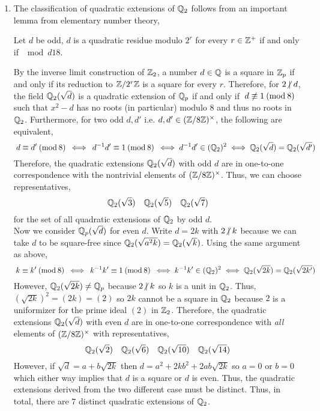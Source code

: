 \documentclass[12pt]{extarticle}
\begin{document}
\begin{enumerate}
\begin{enumerate}
\item The classification of quadratic extensions of $\mathbb{Q}_2$ follows from an important lemma from elementary number theory,
\begin{lemma}
Let $d$ be odd, $d$ is a quadratic residue modulo $2^r$ for every $r \in \mathbb{Z}^{+}$ if and only if $\mod{d}{1}{8}$. 
\end{lemma}
By the inverse limit construction of $\mathbb{Z}_2$, a number $d \in \mathbb{Q}$ is a square in $\mathbb{Z}_p$ if and only if its reduction to $\mathbb{Z}/2^r\mathbb{Z}$ is a square for every $r$. Therefore, for $2 \ndivides d$, the field $\mathbb{Q}_2(\sqrt{d})$ is a quadratic extension of $\mathbb{Q}_p$ if and only if $\nmod{d}{1}{8}$ such that $x^2 - d$ has no roots (in particular) modulo $8$ and thus no roots in $\mathbb{Q}_2$. Furthermore, for two odd $d,d'$ i.e. $d, d' \in (\mathbb{Z}/8\mathbb{Z})^\times$, the following are equivalent,
\[\: d \equiv d' \: (\mathrm{mod} \: 8) \: \iff \: d^{-1}d' \equiv 1 \: (\mathrm{mod} \: 8) \: \iff d^{-1} d' \in (\mathbb{Q}_2)^2 \iff \mathbb{Q}_2(\sqrt{d}) = \mathbb{Q}_2(\sqrt{d'})
\] 
Therefore, the quadratic extensions $\mathbb{Q}_2(\sqrt{d})$ with odd $d$ are in one-to-one correspondence with the nontrivial elements of $(\mathbb{Z}/8\mathbb{Z})^\times$. Thus, we can choose representatives,
\[ \mathbb{Q}_2(\sqrt{3}) \quad \mathbb{Q}_2(\sqrt{5}) \quad \mathbb{Q}_2(\sqrt{7})\]
for the set of all quadratic extensions of $\mathbb{Q}_2$ by odd $d$. \bigskip\\
Now we consider $\mathbb{Q}_p(\sqrt{d})$ for even $d$. Write $d = 2 k$ with $2 \ndivides k$ because we can take $d$ to be square-free since $\mathbb{Q}_2(\sqrt{a^2 k}) = \mathbb{Q}_2(\sqrt{k})$. Using the same argument as above,  
\[\: k \equiv k' \: (\mathrm{mod} \: 8) \: \iff \: k^{-1}k' \equiv 1 \: (\mathrm{mod} \: 8) \: \iff k^{-1} k' \in (\mathbb{Q}_2)^2 \iff \mathbb{Q}_2(\sqrt{2k}) = \mathbb{Q}_2(\sqrt{2k'})
\] 
However, $\mathbb{Q}_2(\sqrt{2k}) \neq \mathbb{Q}_p$ because $2 \ndivides k$ so $k$ is a unit in $\mathbb{Q}_2$. Thus, $(\sqrt{2k})^2 = (2k) = (2)$ so $2k$ cannot be a square in $\mathbb{Q}_2$ because $2$ is a uniformizer for the prime ideal $(2)$ in $\mathbb{Z}_2$. 
Therefore, the quadratic extensions $\mathbb{Q}_2(\sqrt{d})$ with even $d$ are in one-to-one correspondence with \textit{all} elements of $(\mathbb{Z}/8\mathbb{Z})^\times$ with representatives,
\[ \mathbb{Q}_2(\sqrt{2}) \quad \mathbb{Q}_2(\sqrt{6}) \quad \mathbb{Q}_2(\sqrt{10}) \quad \mathbb{Q}_2(\sqrt{14}) \] 
However, if $\sqrt{d} = a + b \sqrt{2k}$ then $d = a^2 + 2k b^2 + 2 a b \sqrt{2k}$ so $a = 0$ or $b = 0$ which either way implies that $d$ is a square or $d$ is even. Thus, the quadratic extensions derived from the two different case must be distinct. Thus, in total, there are $7$ distinct quadratic extensions of $\mathbb{Q}_2$. 
\end{enumerate}


\end{enumerate}
\end{document}
